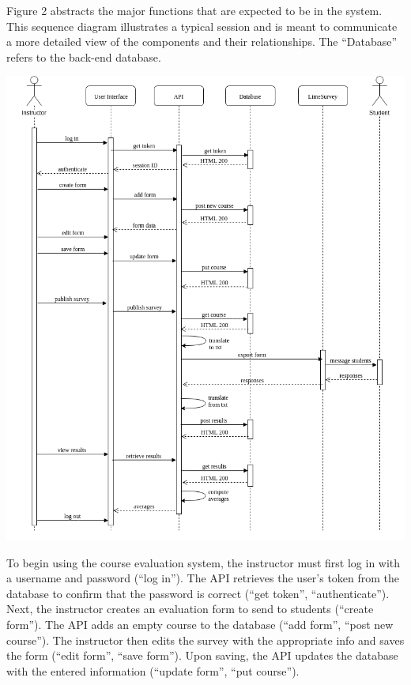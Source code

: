 \documentclass{article}
\begin{document}
Figure 2 abstracts the major functions that are expected to be in the system. This sequence diagram illustrates a typical session and is meant to communicate a more detailed view of the components and their relationships. The ``Database'' refers to the back-end database.

\begin{center}
\label{fig:sequencediagram}
{\includegraphics[scale=.61]{images/sequence_diagram.png}} 
\end{center}

To begin using the course evaluation system, the instructor must first log in with a username and password (``log in''). The API retrieves the user's token from the database to confirm that the password is correct (``get token'', ``authenticate''). Next, the instructor creates an evaluation form to send to students (``create form''). The API adds an empty course to the database (``add form'', ``post new course''). The instructor then edits the survey with the appropriate info and saves the form (``edit form'', ``save form''). Upon saving, the API updates the database with the entered information (``update form'', ``put course'').
\end{document}
